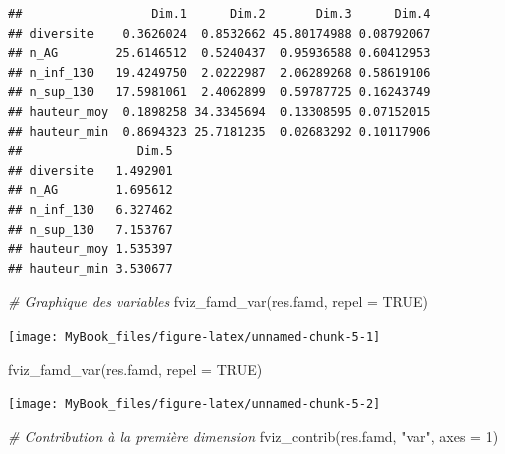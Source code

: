 \documentclass[
  12pt,
  american,
  a4paper,
  extrafontsizes,onecolumn,openright
  ]{memoir}
\newenvironment{Shaded}{\begin{snugshade}}{\end{snugshade}}
\newcommand{\AttributeTok}[1]{\textcolor[rgb]{0.77,0.63,0.00}{#1}}
\newcommand{\CommentTok}[1]{\textcolor[rgb]{0.56,0.35,0.01}{\textit{#1}}}
\newcommand{\ConstantTok}[1]{\textcolor[rgb]{0.00,0.00,0.00}{#1}}
\newcommand{\DecValTok}[1]{\textcolor[rgb]{0.00,0.00,0.81}{#1}}
\newcommand{\FunctionTok}[1]{\textcolor[rgb]{0.00,0.00,0.00}{#1}}
\newcommand{\NormalTok}[1]{#1}
\newcommand{\SpecialCharTok}[1]{\textcolor[rgb]{0.00,0.00,0.00}{#1}}
\newcommand{\StringTok}[1]{\textcolor[rgb]{0.31,0.60,0.02}{#1}}
\begin{document}
\begin{Shaded}
\end{Shaded}

\begin{verbatim}
##                  Dim.1      Dim.2       Dim.3      Dim.4
## diversite    0.3626024  0.8532662 45.80174988 0.08792067
## n_AG        25.6146512  0.5240437  0.95936588 0.60412953
## n_inf_130   19.4249750  2.0222987  2.06289268 0.58619106
## n_sup_130   17.5981061  2.4062899  0.59787725 0.16243749
## hauteur_moy  0.1898258 34.3345694  0.13308595 0.07152015
## hauteur_min  0.8694323 25.7181235  0.02683292 0.10117906
##                Dim.5
## diversite   1.492901
## n_AG        1.695612
## n_inf_130   6.327462
## n_sup_130   7.153767
## hauteur_moy 1.535397
## hauteur_min 3.530677
\end{verbatim}

\normalsize

\scriptsize

\begin{Shaded}
\begin{Highlighting}[]
\CommentTok{\# Graphique des variables}
\FunctionTok{fviz\_famd\_var}\NormalTok{(res.famd, }\AttributeTok{repel =} \ConstantTok{TRUE}\NormalTok{)}
\end{Highlighting}
\end{Shaded}

\begin{center}\texttt{[image: MyBook\_files/figure-latex/unnamed-chunk-5-1]} \end{center}

\begin{Shaded}
\begin{Highlighting}[]
\FunctionTok{fviz\_famd\_var}\NormalTok{(res.famd, }\AttributeTok{repel =} \ConstantTok{TRUE}\NormalTok{)}
\end{Highlighting}
\end{Shaded}

\begin{center}\texttt{[image: MyBook\_files/figure-latex/unnamed-chunk-5-2]} \end{center}

\begin{Shaded}
\begin{Highlighting}[]
\CommentTok{\# Contribution à la première dimension}
\FunctionTok{fviz\_contrib}\NormalTok{(res.famd, }\StringTok{"var"}\NormalTok{, }\AttributeTok{axes =} \DecValTok{1}\NormalTok{)}
\end{Highlighting}
\end{Shaded}
\end{document}
